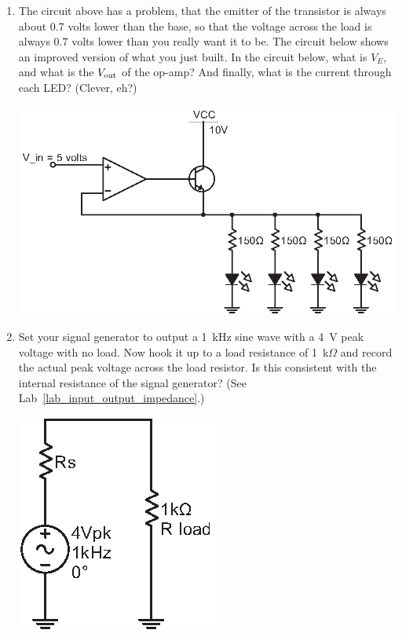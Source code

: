 \begin{enumerate}[wide]
\item The circuit above has a problem, that the emitter of the transistor is always about 0.7 volts lower than the base, so that the voltage across the load is always 0.7 volts lower than you really want it to be.  The circuit below shows an improved version of what you just built.  In the circuit below, what is $V_E$, and what is the $V_{\rm out}$ of the op-amp?  And finally, what is the current through each LED?  (Clever, eh?)  \label{part_buffer_op-amp_emitter_follower}
\begin{center}
\includegraphics{bjt/emitter_follower2.eps}
\end{center}

\item Set your signal generator to output a 1~kHz sine wave with a 4~V peak voltage with no load.  Now hook it up to a load resistance of 1~k$\Omega$ and record the actual peak voltage across the load resistor.  Is this consistent with the internal resistance of the signal generator?  (See Lab~\ref{lab_input_output_impedance}.)
 \begin{center}
\includegraphics{bjt/unamplified_ac.eps}
\end{center}


\end{enumerate}
